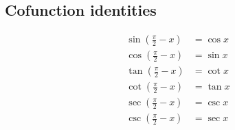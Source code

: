 \subsection*{Cofunction identities}

\begin{align*}
  \sin(\frac{\pi}{2} - x) &= \cos x\\
  \cos(\frac{\pi}{2} - x) &= \sin x\\
  \tan(\frac{\pi}{2} - x) &= \cot x\\
  \cot(\frac{\pi}{2} - x) &= \tan x\\
  \sec(\frac{\pi}{2} - x) &= \csc x\\
  \csc(\frac{\pi}{2} - x) &= \sec x
\end{align*}